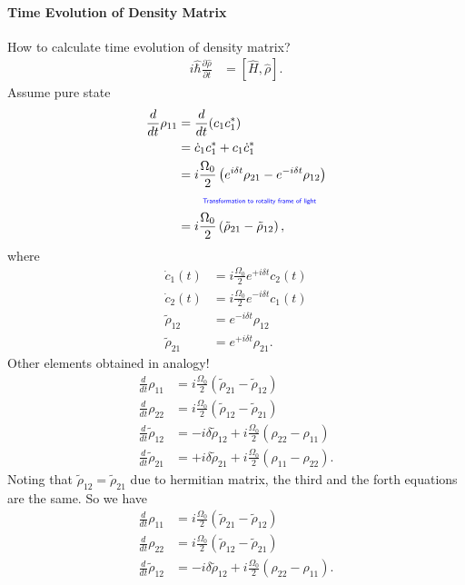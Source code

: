 \documentclass[../../note.tex]{subfiles}
\begin{document}
\paragraph{Time Evolution of Density Matrix}
How to calculate time evolution of density matrix?
\begin{align}
    i \hat{\hbar} \frac{\partial \hat{\rho}}{\partial t}
    &= [\hat{H}, \hat{\rho}].
\end{align}
Assume pure state
\begin{align}
    \frac{d}{d t} \rho_{11}
    &= \frac{d}{d t}(c_1 c_1^\ast) \\
    &= \dot{c}_1 c_1^\ast + c_1 \dot{c}_1^\ast \\
    &= i \frac{\Omega_0}{2} \left(e^{i \delta t} \rho_{21} - e^{-i \delta t} \rho_{12} \right) \\
    &\qquad\text{\color{blue}{\tiny\sffamily Transformation to rotality frame of light}} \nonumber \\
    &= i \frac{\Omega_0}{2} \left(\tilde{\rho}_{21} - \tilde{\rho}_{12}\right),
\end{align}
where
\begin{align}
    \dot{c}_1(t)
    &= i \frac{\Omega_0}{2} e^{+i \delta t} c_2(t) \\
    \dot{c}_2(t)
    &= i \frac{\Omega_0}{2} e^{-i \delta t} c_1(t) \\
    \tilde{\rho}_{12} 
    &= e^{-i \delta t} \rho_{12} \\
    \tilde{\rho}_{21} 
    &= e^{+i \delta t} \rho_{21}.
\end{align}
Other elements obtained in analogy!
\begin{align}
    \frac{d}{d t} \rho_{11}
    &= i \frac{\Omega_0}{2} \left(\tilde{\rho}_{21} - \tilde{\rho}_{12}\right) \\
    \frac{d}{d t} \rho_{22}
    &= i \frac{\Omega_0}{2} \left(\tilde{\rho}_{12} - \tilde{\rho}_{21}\right) \\
    \frac{d}{d t} \tilde{\rho}_{12}
    &= -i \delta \tilde{\rho}_{12} + i \frac{\Omega_0}{2} \left(\rho_{22} - \rho_{11}\right) \\
    \frac{d}{d t} \tilde{\rho}_{21}
    &= +i \delta \tilde{\rho}_{21} + i \frac{\Omega_0}{2} \left(\rho_{11} - \rho_{22}\right).
\end{align}
Noting that $\tilde{\rho}_{12} = \tilde{\rho}_{21}$ due to hermitian matrix, the third and the forth equations are the same. So we have
\begin{align}
    \frac{d}{d t} \rho_{11}
    &= i \frac{\Omega_0}{2} \left(\tilde{\rho}_{21} - \tilde{\rho}_{12}\right) \\
    \frac{d}{d t} \rho_{22}
    &= i \frac{\Omega_0}{2} \left(\tilde{\rho}_{12} - \tilde{\rho}_{21}\right) \\
    \frac{d}{d t} \tilde{\rho}_{12}
    &= -i \delta \tilde{\rho}_{12} + i \frac{\Omega_0}{2} \left(\rho_{22} - \rho_{11}\right).
\end{align}
\end{document}
